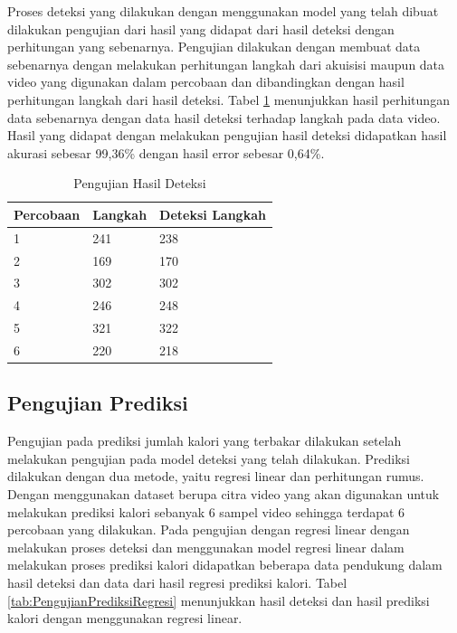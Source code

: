 Proses deteksi yang dilakukan dengan menggunakan model yang telah dibuat dilakukan pengujian dari hasil yang didapat dari hasil deteksi dengan perhitungan yang sebenarnya. Pengujian dilakukan dengan membuat data sebenarnya dengan melakukan perhitungan langkah dari akuisisi maupun data video yang digunakan dalam percobaan dan dibandingkan dengan hasil perhitungan langkah dari hasil deteksi. Tabel \ref{tab:PengujianDeteksi} menunjukkan hasil perhitungan data sebenarnya dengan data hasil deteksi terhadap langkah pada data video. Hasil yang didapat dengan melakukan pengujian hasil deteksi didapatkan hasil akurasi sebesar 99,36\% dengan hasil error sebesar 0,64\%.

\begin{table} [ht]
  \caption{Pengujian Hasil Deteksi}
  \label{tab:PengujianDeteksi}
  \centering
  \begin{tabular}{lll}
    \toprule
    Percobaan & Langkah & Deteksi Langkah  \\
    \midrule
    1   & 241   & 238    \\
    2   & 169   & 170    \\
    3   & 302   & 302    \\
    4   & 246   & 248    \\
    5   & 321   & 322    \\
    6   & 220   & 218    \\
    \bottomrule
  \end{tabular}
\end{table}


\subsection{Pengujian Prediksi}
\label{subsec:PengujianPrediksi}

Pengujian pada prediksi jumlah kalori yang terbakar dilakukan setelah melakukan pengujian pada model deteksi yang telah dilakukan. Prediksi dilakukan dengan dua metode, yaitu regresi linear dan perhitungan rumus. Dengan menggunakan dataset berupa citra video yang akan digunakan untuk melakukan prediksi kalori sebanyak 6 sampel video sehingga terdapat 6 percobaan yang dilakukan. Pada pengujian dengan regresi linear dengan melakukan proses deteksi dan menggunakan model regresi linear dalam melakukan proses prediksi kalori didapatkan beberapa data pendukung dalam hasil deteksi dan data dari hasil regresi prediksi kalori. Tabel \ref{tab:PengujianPrediksiRegresi} menunjukkan hasil deteksi dan hasil prediksi kalori dengan menggunakan regresi linear.

